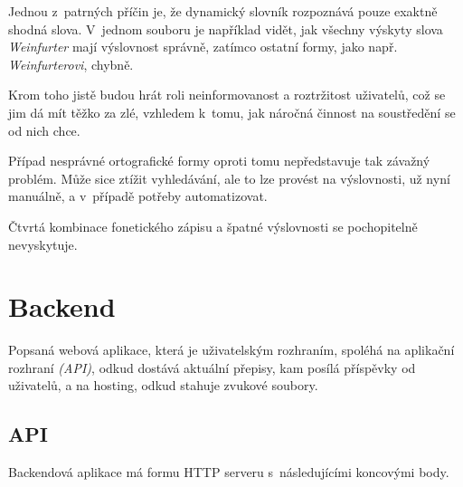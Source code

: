 Jednou z~patrných příčin je, že dynamický slovník rozpoznává pouze exaktně
shodná slova. V~jednom souboru je například vidět, jak všechny výskyty slova
{\em Weinfurter} mají výslovnost správně, zatímco ostatní formy, jako např. {\em
Weinfurterovi}, chybně.

Krom toho jistě budou hrát roli neinformovanost a roztržitost uživatelů, což se
jim dá mít těžko za zlé, vzhledem k~tomu, jak náročná činnost na soustředění se
od nich chce.

Případ nesprávné ortografické formy oproti tomu nepředstavuje tak závažný
problém. Může sice ztížit vyhledávání, ale to lze provést na výslovnosti,
už nyní manuálně, a v~případě potřeby automatizovat.

Čtvrtá kombinace fonetického zápisu a špatné výslovnosti se pochopitelně
nevyskytuje.

\normalfont 

\section{Backend}

Popsaná webová aplikace, která je uživatelským rozhraním, spoléhá na aplikační
rozhraní {\em (API)}, odkud dostává aktuální přepisy, kam posílá příspěvky od
uživatelů, a na hosting, odkud stahuje zvukové soubory.

\subsection{API}

Backendová aplikace má formu HTTP serveru s~následujícími koncovými body.

